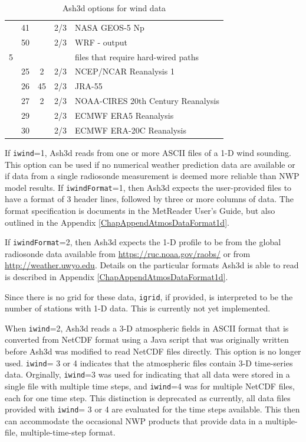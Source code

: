 \begin{table}[htbp]
\begin{center}
\begin{tabular}{| c | c| c | c | l |}
 &41&   &2/3&NASA GEOS-5 Np\\
 &50&   &2/3&WRF - output\\
\hline
5& & & &files that require hard-wired paths \\
\hline
 &25&  2&2/3&NCEP/NCAR Reanalysis 1\\
 &26& 45&2/3&JRA-55\\
 &27&  2&2/3&NOAA-CIRES 20th Century Reanalysis\\
 &29&   &2/3&ECMWF ERA5 Reanalysis\\
 &30&   &2/3&ECMWF ERA-20C Reanalysis\\
\hline
\end{tabular}
\caption{\label{tab:MetOptions}Ash3d options for wind data}
\end{center}
\end{table}
\normalsize

If \texttt{iwind}=1, Ash3d reads from one or more ASCII files of a 1-D wind sounding.
This option can be used if no numerical weather prediction
data are available or if data from a single radiosonde measurement is deemed more
reliable than NWP model results.
If \texttt{iwindFormat}=1, then Ash3d expects the user-provided files to have a format
of 3 header lines, followed by three or more columns of data.  The format specification
is documents in the MetReader User's Guide, but also outlined in the
Appendix \ref{ChapAppendAtmosDataFormat1d}.

If \texttt{iwindFormat}=2, then Ash3d expects the 1-D profile to be from the global
radiosonde data available from \url{https://ruc.noaa.gov/raobs/} or from
\url{http://weather.uwyo.edu}.  Details on the particular formats Ash3d is able to
read is described in Appendix \ref{ChapAppendAtmosDataFormat1d}.

Since there is no grid for these data, \texttt{igrid}, if provided, is interpreted to
be the number of stations with 1-D data.  This is currently not yet implemented.

When \texttt{iwind}=2, Ash3d reads a 3-D atmospheric fields in ASCII format that is converted from
NetCDF format using a Java script that was originally written before Ash3d was
modified to read NetCDF files directly. This option is no longer used.
\texttt{iwind}= 3 or 4 indicates that the atmospheric files contain 3-D time-series
data.  Orginally, \texttt{iwind}=3 was used for indicating that all data were stored in
a single file with multiple time steps, and \texttt{iwind}=4 was for multiple NetCDF files,
each for one time step.  This distinction is deprecated as currently, all data
files provided with \texttt{iwind}= 3 or 4 are evaluated for the time steps available.
This then can accommodate the occasional NWP products that provide data in a
multiple-file, multiple-time-step format.


